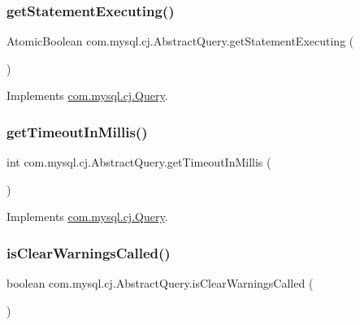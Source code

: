 \subsubsection{\texorpdfstring{get\+Statement\+Executing()}{getStatementExecuting()}}
{\footnotesize\ttfamily Atomic\+Boolean com.\+mysql.\+cj.\+Abstract\+Query.\+get\+Statement\+Executing (\begin{DoxyParamCaption}{ }\end{DoxyParamCaption})}



Implements \mbox{\hyperlink{interfacecom_1_1mysql_1_1cj_1_1_query_a330ed617e56f62061a3a300128456dbb}{com.\+mysql.\+cj.\+Query}}.

\mbox{\label{classcom_1_1mysql_1_1cj_1_1_abstract_query_a4ff067e743c86f5349676c6bddc26eab}} 
\subsubsection{\texorpdfstring{get\+Timeout\+In\+Millis()}{getTimeoutInMillis()}}
{\footnotesize\ttfamily int com.\+mysql.\+cj.\+Abstract\+Query.\+get\+Timeout\+In\+Millis (\begin{DoxyParamCaption}{ }\end{DoxyParamCaption})}



Implements \mbox{\hyperlink{interfacecom_1_1mysql_1_1cj_1_1_query_a54f609a5c08b91fe0008e9b3334d0d82}{com.\+mysql.\+cj.\+Query}}.

\mbox{\label{classcom_1_1mysql_1_1cj_1_1_abstract_query_a27bdd1ed787ed128edbbd307731e8120}} 
\subsubsection{\texorpdfstring{is\+Clear\+Warnings\+Called()}{isClearWarningsCalled()}}
{\footnotesize\ttfamily boolean com.\+mysql.\+cj.\+Abstract\+Query.\+is\+Clear\+Warnings\+Called (\begin{DoxyParamCaption}{ }\end{DoxyParamCaption})}



